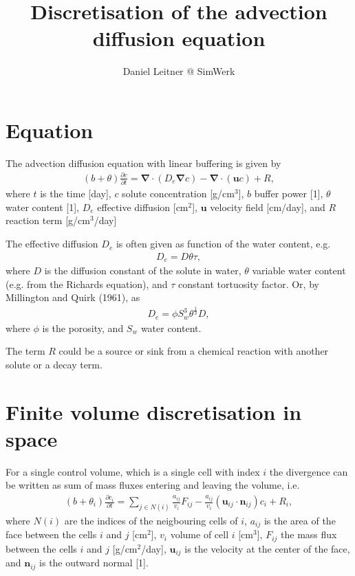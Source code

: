 \documentclass[a4paper,10pt]{article}
\title{Discretisation of the advection diffusion equation}
\author{Daniel Leitner @ SimWerk}
\begin{document}
\maketitle

\section{Equation}

The advection diffusion equation with linear buffering is given by
\begin{eqnarray}
 (b+\theta) \frac{\partial c}{\partial t}  = \mathbf{\nabla} \cdot (D_e \mathbf{\nabla} c) - \mathbf{\nabla} \cdot (\mathbf{u} c) + R,  
\end{eqnarray}
where $t$ is the time [day], $c$  solute concentration [g/cm$^3$], $b$ buffer power [1], $\theta$ water content [1], $D_e$ effective diffusion [cm$^2$], $\mathbf{u}$ velocity field [cm/day], and $R$ reaction term [g/cm$^3$/day]    

The effective diffusion $D_e$ is often given as function of the water content, e.g.
\begin{eqnarray}
 D_e = D \theta  \tau,  
\end{eqnarray}
where $D$ is the diffusion constant of the solute in water, $\theta$ variable water content (e.g. from the Richards equation), and $\tau$ constant tortuosity factor. Or, by Millington and Quirk (1961), as 
\begin{eqnarray}
D_e = \phi S_w^3 \theta^{\frac13} D,
\end{eqnarray}
where $\phi$ is the porosity, and $S_w$ water content.

The term $R$ could be a source or sink from a chemical reaction with another solute or a decay term.

\section{Finite volume discretisation in space}

For a single control volume, which is a single cell with index $i$ the divergence can be written as sum of mass fluxes entering and leaving the volume, i.e.
\begin{eqnarray}
 (b+\theta_i) \frac{\partial c_i}{\partial t}  = \sum_{j \in N(i)} \frac{a_{ij}}{v_i}  F_{ij} - \frac{a_{ij}}{v_i}(\mathbf{u}_{ij} \cdot \mathbf{n}_{ij}) c_i + R_i,  \label{eqn:fv}
\end{eqnarray}
where $N(i)$ are the indices of the neigbouring cells of $i$, $a_{ij}$ is the area of the face between the cells $i$ and $j$ [cm$^2$], $v_i$ volume of cell $i$ [cm$^3$], $F_{ij}$ the mass flux between the cells $i$ and $j$ [g/cm$^2$/day], $\mathbf{u}_{ij}$ is the velocity at the center of the face, and $\mathbf{n}_{ij}$ is the outward normal [1].
\end{document}
